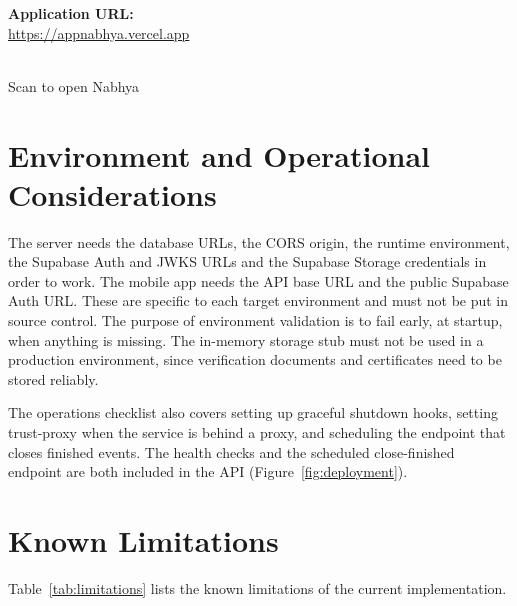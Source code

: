 \begin{center}
\begin{minipage}[c]{0.58\textwidth}
\textbf{Application URL:}\\[0.08in]
\url{https://appnabhya.vercel.app}
\end{minipage}\hfill
\begin{minipage}[c]{0.34\textwidth}
\centering
{}\\[0.06in]
{\footnotesize Scan to open Nabhya}
\end{minipage}
\end{center}


\section{Environment and Operational Considerations}
The server needs the database URLs, the CORS origin, the runtime environment, the Supabase Auth and JWKS URLs and the Supabase Storage credentials in order to work. The mobile app needs the API base URL and the public Supabase Auth URL. These are specific to each target environment and must not be put in source control. The purpose of environment validation is to fail early, at startup, when anything is missing. The in-memory storage stub must not be used in a production environment, since verification documents and certificates need to be stored reliably.

The operations checklist also covers setting up graceful shutdown hooks, setting trust-proxy when the service is behind a proxy, and scheduling the endpoint that closes finished events. The health checks and the scheduled close-finished endpoint are both included in the API (Figure~\ref{fig:deployment}).

\section{Known Limitations}
\label{sec:limitations}
Table~\ref{tab:limitations} lists the known limitations of the current implementation.

